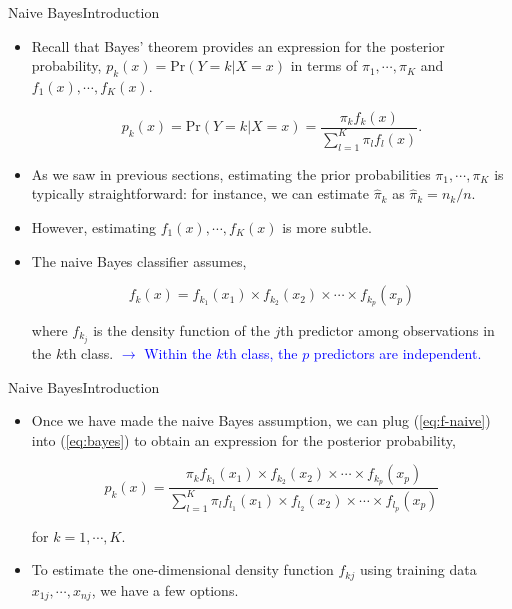 \begin{frame}{Naive Bayes}{Introduction}
    \begin{itemize}
    
        \item Recall that Bayes’ theorem provides an expression for the posterior probability, $p_k(x) =  \text{Pr}(Y=k|X=x)$ in terms of $\pi_1 , \cdots , \pi_K$ and $f_1(x), \cdots , f_K(x)$. \pause

        \begin{equation*}
           p_k(x) =  \text{Pr}(Y=k|X=x) = \frac{\pi_k f_k (x)}{  \sum_{l=1}^K \pi_l f_l(x)  }. 
        \end{equation*} \pause
        
        \item As we saw in previous sections, estimating the prior probabilities $\pi_1 , \cdots , \pi_K$ is typically straightforward: for instance, we can estimate $\hat{\pi}_k$ as $\hat{\pi}_k = n_k / n$. \pause
        
        \item However, estimating $f_1(x), \cdots , f_K(x)$ is more subtle. \pause

        \item The naive Bayes classifier assumes, 

        \begin{equation}\label{eq:f-naive}
            f_k(x) = f_{k_1} (x_1) \times f_{k_2} (x_2) \times \cdots \times f_{k_p} (x_p)  
        \end{equation} \pause 
        
        where $f_{k_j}$ is the density function of the $j$th predictor among observations in the $k$th class. \pause  \textcolor{blue}{$\rightarrow$ Within the $k$th class, the $p$ predictors are independent. }
        
    \end{itemize}
\end{frame}

\begin{frame}{Naive Bayes}{Introduction}
    \begin{itemize}
        \item Once we have made the naive Bayes assumption, we can plug (\ref{eq:f-naive}) into (\ref{eq:bayes}) to obtain an expression for the posterior probability,

        \begin{equation}\label{eq:naive-prob}
            p_k(x) = \frac{\pi_k f_{k_1} (x_1) \times f_{k_2} (x_2) \times \cdots \times f_{k_p} (x_p)  }{  \sum_{l=1}^K \pi_l f_{l_1} (x_1) \times f_{l_2} (x_2) \times \cdots \times f_{l_p} (x_p)  }
        \end{equation} \pause

        for $k = 1, \cdots, K.$

        \item To estimate the one-dimensional density function $f_{kj}$ using training data $x_{1j} , \cdots, x_{nj} $, we have a few options.

    \end{itemize}


\end{frame}

